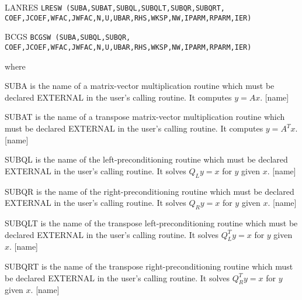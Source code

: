 \begin{list}{}{
            \leftmargin 1.00in \rightmargin 0.25in}
\item[LANRES \hfill]
{\tt LRESW (SUBA,SUBAT,SUBQL,SUBQLT,SUBQR,SUBQRT, \\
 \hspace*{0.75in} COEF,JCOEF,WFAC,JWFAC,N,U,UBAR,RHS,WKSP,NW,IPARM,RPARM,IER) }

\item[BCGS \hfill]
{\tt BCGSW (SUBA,SUBQL,SUBQR, \\
 \hspace*{0.75in} COEF,JCOEF,WFAC,JWFAC,N,U,UBAR,RHS,WKSP,NW,IPARM,RPARM,IER) }
\end{list}
 
\bigskip
\noindent
where
\bigskip
\begin{list}{}{
               \leftmargin 1.00in \rightmargin 0.25in}
 \item[SUBA \hfill]
           is the name of a matrix-vector multiplication routine
           which must be declared EXTERNAL in the user's calling
           routine.  It computes $y=Ax$.  [name]
 
 \item[SUBAT \hfill]
           is the name of a transpose matrix-vector multiplication
           routine which must be declared EXTERNAL in the user's
           calling routine.  It computes $y=A^Tx$.  [name]
 
 \item[SUBQL \hfill]
           is the name of the left-preconditioning routine which
           must be declared EXTERNAL in the user's calling routine.
           It solves $Q_Ly=x$ for $y$ given $x$.  [name]
 
 \item[SUBQR \hfill]
           is the name of the right-preconditioning routine which
           must be declared EXTERNAL in the user's calling routine.
           It solves $Q_Ry=x$ for $y$ given $x$.  [name]
 
 \item[SUBQLT \hfill]
           is the name of the transpose left-preconditioning routine
           which must be declared EXTERNAL in the user's calling
           routine.  It solves $Q_L^Ty=x$ for $y$ given $x$.
           [name]
 
 \item[SUBQRT \hfill]
           is the name of the transpose right-preconditioning routine
           which must be declared EXTERNAL in the user's calling
           routine.  It solves $Q_R^Ty=x$ for $y$ given $x$.
           [name]
 

\end{list}
